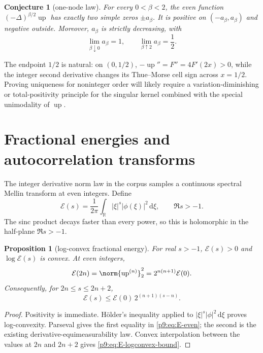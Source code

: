 \documentclass[11pt,oneside]{article}
\newtheorem{proposition}[theorem]{Proposition}
\newtheorem{conjecture}[theorem]{Conjecture}
\theoremstyle{definition}
\theoremstyle{remark}
\newcommand{\Up}{\operatorname{up}}
\newcommand{\R}{\mathbb R}
\newcommand{\dd}{\,\mathrm d}
\newcommand{\1}{\mathbf 1}
\begin{document}
\begin{conjecture}[one-node law]
\label{p9:conj:one-node}
For every $0<\beta<2$, the even function
$(-\Delta)^{\beta/2}\Up$ has exactly two simple zeros $\pm a_\beta$.
It is positive on $(-a_\beta,a_\beta)$ and negative outside.  Moreover,
$a_\beta$ is strictly decreasing, with
\begin{equation}
 \lim_{\beta\downarrow0}a_\beta=1,
 \qquad
 \lim_{\beta\uparrow2}a_\beta=\frac12.
 \label{p9:eq:one-node-limits}
\end{equation}
\end{conjecture}

The endpoint $1/2$ is natural: on $(0,1/2)$,
$-\Up''=F''=4F'(2x)>0$, while the integer second derivative changes its
Thue--Morse cell sign across $x=1/2$.  Proving uniqueness for noninteger order
will likely require a variation-diminishing or total-positivity principle for
the singular kernel combined with the special unimodality of $\Up$.

\section{Fractional energies and autocorrelation transforms}
\label{p9:sec:fractional-energy}

The integer derivative norm law in the corpus samples a continuous spectral
Mellin transform at even integers.  Define
\begin{equation}
 \mathcal E(s)
 =\frac1{2\pi}\int_{\R}|\xi|^s|\phi(\xi)|^2\dd\xi,
 \qquad \Re s>-1.
 \label{p9:eq:E-s}
\end{equation}
The sinc product decays faster than every power, so this is holomorphic in the
half-plane $\Re s>-1$.

\begin{proposition}[log-convex fractional energy]
For real $s>-1$, $\mathcal E(s)>0$ and $\log\mathcal E(s)$ is convex.  At even
integers,
\begin{equation}
 \mathcal E(2n)=\norm{\Up^{(n)}}_2^2
 =2^{n(n+1)}\mathcal E(0).
 \label{p9:eq:E-even}
\end{equation}
Consequently, for $2n\le s\le2n+2$,
\begin{equation}
 \mathcal E(s)
 \le \mathcal E(0)\,2^{(n+1)(s-n)}.
 \label{p9:eq:E-logconvex-bound}
\end{equation}
\end{proposition}

\begin{proof}
Positivity is immediate.  Hölder's inequality applied to
$|\xi|^s|\phi|^2\dd\xi$ proves log-convexity.  Parseval gives the first equality
in \cref{p9:eq:E-even}; the second is the existing derivative-equimeasurability
law.  Convex interpolation between the values at $2n$ and $2n+2$ gives
\cref{p9:eq:E-logconvex-bound}.
\end{proof}
\end{document}
